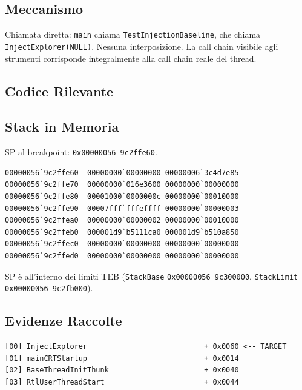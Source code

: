 \subsection{Meccanismo}

Chiamata diretta: \texttt{main} chiama \texttt{TestInjectionBaseline}, che
chiama \texttt{InjectExplorer(NULL)}. Nessuna interposizione. La call chain
visibile agli strumenti corrisponde integralmente alla call chain reale del
thread.

\subsection{Codice Rilevante}



\subsection{Stack in Memoria}

SP al breakpoint: \texttt{0x00000056\,9c2ffe60}.

\begin{lstlisting}[style=outstyle,
  caption={Output di \texttt{dq sp L10} al breakpoint su \texttt{InjectExplorer}
           (Baseline)},
  label={lst:sc1-spdump}]
00000056`9c2ffe60  00000000`00000000 00000006`3c4d7e85
00000056`9c2ffe70  00000000`016e3600 00000000`00000000
00000056`9c2ffe80  00001000`0000000c 00000000`00010000
00000056`9c2ffe90  00007fff`fffeffff 00000000`00000003
00000056`9c2ffea0  00000000`00000002 00000000`00010000
00000056`9c2ffeb0  000001d9`b5111ca0 000001d9`b510a850
00000056`9c2ffec0  00000000`00000000 00000000`00000000
00000056`9c2ffed0  00000000`00000000 00000000`00000000
\end{lstlisting}

{\sloppy SP è all'interno dei limiti TEB
(\texttt{StackBase} \texttt{0x00000056\,9c300000},
\texttt{StackLimit} \texttt{0x00000056\,9c2fb000}).\par}

\subsection{Evidenze Raccolte}

\begin{lstlisting}[style=outstyle,
  caption={\texttt{CaptureStackBackTrace} dall'interno di \texttt{InjectExplorer}
           (Baseline, dati da console)},
  label={lst:sc1-cbt}]
[00] InjectExplorer                           + 0x0060 <-- TARGET
[01] mainCRTStartup                           + 0x0014
[02] BaseThreadInitThunk                      + 0x0040
[03] RtlUserThreadStart                       + 0x0044
\end{lstlisting}

